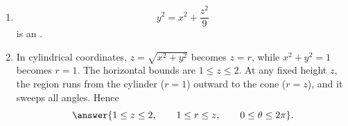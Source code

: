 \begin{enumerate}[label=\textbf{\arabic*.}, start=3]
\[\begin{array}{c|l}
26&-x^2+y^2-z^2=1:\ \text{two-sheet hyperboloid, axis }y\\
27&y=2x^2+z^2:\ \text{elliptic paraboloid opening in }+y\\
28&y^2=x^2+2z^2:\ \text{elliptic cone, axis }y\\
29&x^2+2z^2=1:\ \text{elliptic cylinder parallel to }y\\
30&y=x^2-z^2:\ \text{hyperbolic paraboloid (saddle)}
\end{array}
\]
\setcounter{enumi}{32}
\item \[y^2=x^2+\frac{z^2}{9}\] is an .
\setcounter{enumi}{44}
\item In cylindrical coordinates, $z=\sqrt{x^2+y^2}$ becomes $z=r$, while $x^2+y^2=1$ becomes $r=1$.  The horizontal bounds are $1\le z\le2$.  At any fixed height $z$, the region runs from the cylinder ($r=1$) outward to the cone ($r=z$), and it sweeps all angles.  Hence
\[\answer{1\le z\le2,\qquad1\le r\le z,\qquad0\le\theta\le2\pi}.\]
\end{enumerate}
